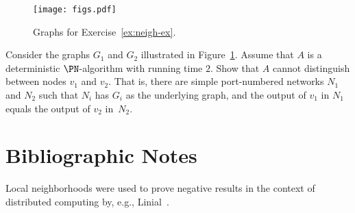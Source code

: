 \begin{figure}
    \centering
    \texttt{[image: figs.pdf]}
    \caption{Graphs for Exercise~\ref{ex:neigh-ex}.}\label{fig:neigh-ex}
\end{figure}

\begin{exs}\label{ex:neigh-ex}
    Consider the graphs $G_1$ and $G_2$ illustrated in Figure~\ref{fig:neigh-ex}. Assume that $A$ is a deterministic $\PN$-algorithm with running time $2$. Show that $A$ cannot distinguish between nodes $v_1$ and $v_2$. That is, there are simple port-numbered networks $N_1$ and $N_2$ such that $N_i$ has $G_i$ as the underlying graph, and the output of $v_1$ in $N_1$ equals the output of $v_2$ in~$N_2$.

\end{exs}


\section{Bibliographic Notes}

Local neighborhoods were used to prove negative results in the context of distributed computing by, e.g., Linial~\cite{linial92locality}.

